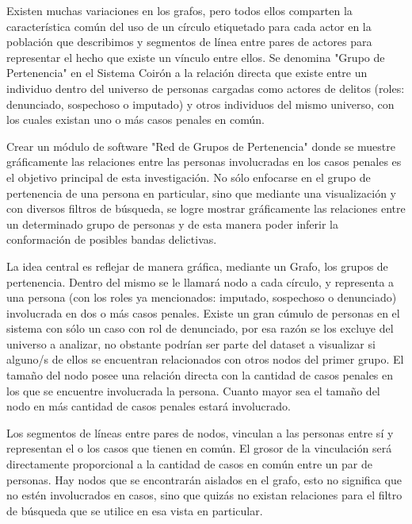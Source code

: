 Existen muchas variaciones en los grafos, pero todos ellos comparten la característica común del uso de un círculo etiquetado para cada actor en la población que describimos y segmentos de línea entre pares de actores para representar el hecho que existe un vínculo entre ellos. Se denomina "Grupo de Pertenencia" en el Sistema Coirón a la relación directa que existe entre un individuo dentro del universo de personas cargadas como actores de delitos (roles: denunciado, sospechoso o imputado) y otros individuos del mismo universo, con los cuales existan uno o más casos penales en común.

Crear un módulo de software "Red de Grupos de Pertenencia" donde se muestre gráficamente las relaciones entre las personas involucradas en los casos penales es el objetivo principal de esta investigación. No sólo enfocarse en el grupo de pertenencia de una persona en particular, sino que mediante una visualización y con diversos filtros de búsqueda, se logre mostrar gráficamente las relaciones entre un determinado grupo de personas y de esta manera poder inferir la conformación de posibles bandas delictivas.

La idea central es reflejar de manera gráfica, mediante un Grafo, los grupos de pertenencia. Dentro del mismo se le llamará nodo a cada círculo, y representa a una persona (con los roles ya mencionados: imputado, sospechoso o denunciado) involucrada en dos o más casos penales. Existe un gran cúmulo de personas en el sistema con sólo un caso con rol de denunciado, por esa razón se los excluye del universo a analizar, no obstante podrían ser parte del dataset a visualizar si alguno/s de ellos se encuentran relacionados con otros nodos del primer grupo. El tamaño del nodo posee una relación directa con la cantidad de casos penales en los que se encuentre involucrada la persona. Cuanto mayor sea el tamaño del nodo en más cantidad de casos penales estará involucrado.

Los segmentos de líneas entre pares de nodos, vinculan a las personas entre sí y representan el o los casos que tienen en común. El grosor de la vinculación será directamente proporcional a la cantidad de casos en común entre un par de personas. Hay nodos que se encontrarán aislados en el grafo, esto no significa que no estén involucrados en casos, sino que quizás no existan relaciones para el filtro de búsqueda que se utilice en esa vista en particular.

